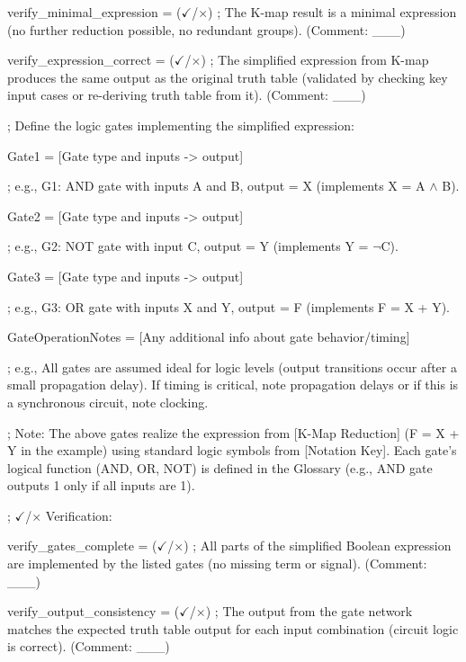 \documentclass[11pt]{article}
\begin{document}
\noindent verify\_minimal\_expression = ($\checkmark$/$\times$) ; The K-map result is a minimal expression (no further reduction possible, no redundant groups). (Comment: \_\_\_)

\noindent verify\_expression\_correct = ($\checkmark$/$\times$) ; The simplified expression from K-map produces the same output as the original truth table (validated by checking key input cases or re-deriving truth table from it). (Comment: \_\_\_)

\vspace{0.5em}


\noindent ; Define the logic gates implementing the simplified expression:

\noindent Gate1 = [Gate type and inputs -> output]

\noindent ; e.g., G1: AND gate with inputs A and B, output = X (implements X = A $\land$ B).

\noindent Gate2 = [Gate type and inputs -> output]

\noindent ; e.g., G2: NOT gate with input C, output = Y (implements Y = $\lnot$C).

\noindent Gate3 = [Gate type and inputs -> output]

\noindent ; e.g., G3: OR gate with inputs X and Y, output = F (implements F = X + Y).

\noindent GateOperationNotes = [Any additional info about gate behavior/timing]

\noindent ; e.g., All gates are assumed ideal for logic levels (output transitions occur after a small propagation delay). If timing is critical, note propagation delays or if this is a synchronous circuit, note clocking.

\noindent ; Note: The above gates realize the expression from [K-Map Reduction] (F = X + Y in the example) using standard logic symbols from [Notation Key]. Each gate's logical function (AND, OR, NOT) is defined in the Glossary (e.g., AND gate outputs 1 only if all inputs are 1).

\vspace{0.5em}

\noindent ; $\checkmark$/$\times$ Verification:

\noindent verify\_gates\_complete = ($\checkmark$/$\times$) ; All parts of the simplified Boolean expression are implemented by the listed gates (no missing term or signal). (Comment: \_\_\_)

\noindent verify\_output\_consistency = ($\checkmark$/$\times$) ; The output from the gate network matches the expected truth table output for each input combination (circuit logic is correct). (Comment: \_\_\_)
\end{document}

